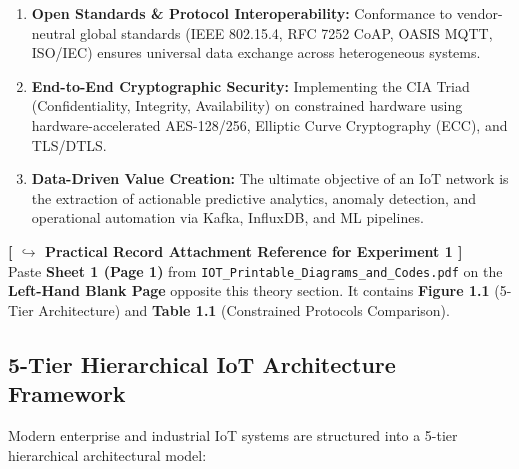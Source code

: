 \documentclass[11pt,a4paper]{article}
\begin{document}
\begin{enumerate}[leftmargin=*]
    \item \textbf{Open Standards \& Protocol Interoperability:} Conformance to vendor-neutral global standards (IEEE 802.15.4, RFC 7252 CoAP, OASIS MQTT, ISO/IEC) ensures universal data exchange across heterogeneous systems.
    \item \textbf{End-to-End Cryptographic Security:} Implementing the CIA Triad (Confidentiality, Integrity, Availability) on constrained hardware using hardware-accelerated AES-128/256, Elliptic Curve Cryptography (ECC), and TLS/DTLS.
    \item \textbf{Data-Driven Value Creation:} The ultimate objective of an IoT network is the extraction of actionable predictive analytics, anomaly detection, and operational automation via Kafka, InfluxDB, and ML pipelines.
\end{enumerate}

\begin{attachmentbox}
\footnotesize
\textbf{[ $\hookrightarrow$ Practical Record Attachment Reference for Experiment 1 ]}\\
Paste \textbf{Sheet 1 (Page 1)} from \texttt{IOT\_Printable\_Diagrams\_and\_Codes.pdf} on the \textbf{Left-Hand Blank Page} opposite this theory section. It contains \textbf{Figure 1.1} (5-Tier Architecture) and \textbf{Table 1.1} (Constrained Protocols Comparison).
\end{attachmentbox}

\subsection{5-Tier Hierarchical IoT Architecture Framework}
Modern enterprise and industrial IoT systems are structured into a 5-tier hierarchical architectural model:
\end{document}
